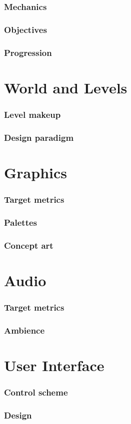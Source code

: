 \documentclass{paper}
\begin{document}
		\section{Mechanics}
			\lipsum[4]
		\section{Objectives}
			\lipsum[4]
		\section{Progression}
			\lipsum[4]
	\part{World and Levels}
		\lipsum[5]
		\section{Level makeup}
			\lipsum[5]
		\section{Design paradigm}
			\lipsum[5]
	\part{Graphics}
		\lipsum[6]
		\section{Target metrics}
			\lipsum[6]
		\section{Palettes}
			\lipsum[6]
		\section{Concept art}
			\lipsum[6]
	\part{Audio}
		\lipsum[7]
		\section{Target metrics}
			\lipsum[7]
		\section{Ambience}
			\lipsum[7]
	\part{User Interface}
		\lipsum[8]
		\section{Control scheme}
			\lipsum[8]
		\section{Design}
			\lipsum[8]
\end{document}
